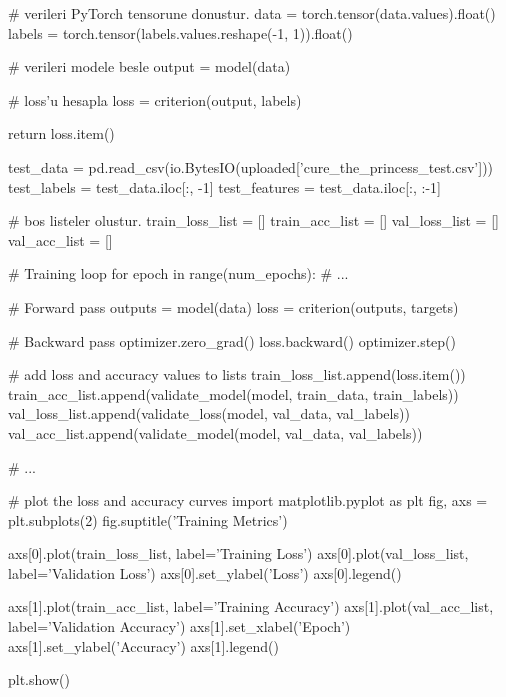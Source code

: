 \documentclass[11pt]{article}
\begin{document}
\begin{python}
    # verileri PyTorch tensorune donustur.
    data = torch.tensor(data.values).float()
    labels = torch.tensor(labels.values.reshape(-1, 1)).float()


    # verileri modele besle
    output = model(data)

    # loss'u hesapla
    loss = criterion(output, labels)

    return loss.item()


test_data = pd.read_csv(io.BytesIO(uploaded['cure_the_princess_test.csv']))
test_labels = test_data.iloc[:, -1]
test_features = test_data.iloc[:, :-1]

# bos listeler olustur.
train_loss_list = []
train_acc_list = []
val_loss_list = []
val_acc_list = []

# Training loop
for epoch in range(num_epochs):
    # ...
    
    # Forward pass
    outputs = model(data)
    loss = criterion(outputs, targets)
    
    # Backward pass
    optimizer.zero_grad()
    loss.backward()
    optimizer.step()
    
    # add loss and accuracy values to lists
    train_loss_list.append(loss.item())
    train_acc_list.append(validate_model(model, train_data, train_labels))
    val_loss_list.append(validate_loss(model, val_data, val_labels))
    val_acc_list.append(validate_model(model, val_data, val_labels))
    
    # ...
    
# plot the loss and accuracy curves
import matplotlib.pyplot as plt
fig, axs = plt.subplots(2)
fig.suptitle('Training Metrics')

axs[0].plot(train_loss_list, label='Training Loss')
axs[0].plot(val_loss_list, label='Validation Loss')
axs[0].set_ylabel('Loss')
axs[0].legend()

axs[1].plot(train_acc_list, label='Training Accuracy')
axs[1].plot(val_acc_list, label='Validation Accuracy')
axs[1].set_xlabel('Epoch')
axs[1].set_ylabel('Accuracy')
axs[1].legend()

plt.show()


\end{python}

\begin{comment}
\begin{figure}[ht!]
    \centering
    \texttt{[image: mypicturehere.png]}
    \caption{Buraya açıklama yazın}
    \label{fig:my_pic}
\end{figure}
\end{comment}
\end{document}
